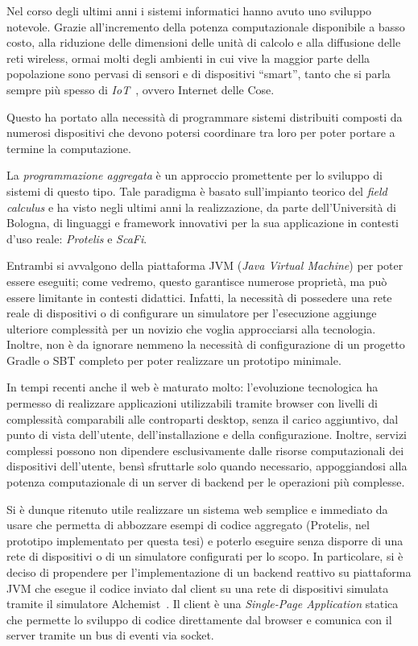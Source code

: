 \label{ch:intro}

Nel corso degli ultimi anni i sistemi informatici hanno avuto uno sviluppo notevole.
Grazie all'incremento della potenza computazionale disponibile a basso costo, alla riduzione delle dimensioni delle unità di calcolo e alla diffusione delle reti wireless,
ormai molti degli ambienti in cui vive la maggior parte della popolazione sono pervasi di sensori e di dispositivi ``smart'', tanto che si parla sempre più spesso di \emph{IoT}~\cite{ashton2009internet}, ovvero Internet delle Cose.

Questo ha portato alla necessità di programmare sistemi distribuiti composti da numerosi dispositivi che devono potersi coordinare tra loro
per poter portare a termine la computazione.

La \emph{programmazione aggregata} è un approccio promettente per lo sviluppo di sistemi di questo tipo.
Tale paradigma è basato sull'impianto teorico del \emph{field calculus} e ha visto negli ultimi anni la realizzazione,
da parte dell'Università di Bologna, di linguaggi e framework innovativi per la sua applicazione in contesti d'uso reale:
\emph{Protelis} e \emph{ScaFi}.

Entrambi si avvalgono della piattaforma JVM (\emph{\emph{J}ava \emph{V}irtual \emph{M}achine}) per poter essere eseguiti;
come vedremo, questo garantisce numerose proprietà, ma può essere limitante in contesti didattici.
Infatti, la necessità di possedere una rete reale di dispositivi o di configurare un simulatore per l'esecuzione
aggiunge ulteriore complessità per un novizio che voglia approcciarsi alla tecnologia.
Inoltre, non è da ignorare nemmeno la necessità di configurazione di un progetto Gradle o SBT completo per poter realizzare un prototipo minimale.

In tempi recenti anche il web è maturato molto:
l'evoluzione tecnologica ha permesso di realizzare applicazioni utilizzabili tramite browser con livelli di complessità comparabili alle controparti desktop,
senza il carico aggiuntivo, dal punto di vista dell'utente, dell'installazione e della configurazione.
Inoltre, servizi complessi possono non dipendere esclusivamente dalle risorse computazionali dei dispositivi dell'utente,
bensì sfruttarle solo quando necessario, appoggiandosi alla potenza computazionale di un server di backend per le operazioni più complesse.

Si è dunque ritenuto utile realizzare un sistema web semplice e immediato da usare che permetta di abbozzare esempi di codice aggregato
(Protelis, nel prototipo implementato per questa tesi) e poterlo eseguire senza disporre di una rete di dispositivi o di un simulatore configurati per lo scopo.
In particolare, si è deciso di propendere per l'implementazione di un backend reattivo su piattaforma JVM che esegue il codice inviato dal client su una rete di dispositivi simulata tramite il simulatore Alchemist~\cite{alchemist-jos2013}.
Il client è una \emph{Single-Page Application} statica che permette lo sviluppo di codice direttamente dal browser e comunica con il server tramite un bus di eventi via socket.

